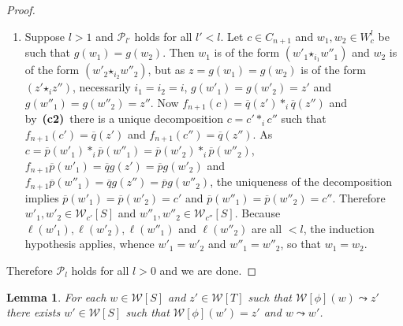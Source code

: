 \documentclass[reqno]{amsart}
\theoremstyle{plain}
\newtheorem{lemma}[subsubsection]{Lemma}
\theoremstyle{definition}
\theoremstyle{remark}
\newcommand{\unit}[1]{1^{#1}} %
\newcommand{\comp}[1]{\ast_{#1}} %
\newcommand{\WW}{\mathcal{W}}
\newcommand{\wtx}[1]{\WW[#1]} %
\newcommand{\wtxr}[2]{\WW_{#1}[#2]} %
\newcommand{\formal}[1]{\mathsf{#1}} %
\newcommand{\fid}[1]{\formal{i}_{#1}} %
\newcommand{\fcomp}[1]{\bm{\star}_{#1}} %
\newcommand{\frel}{\leadsto} %
\newcommand{\lgh}{\ell}%
\newcommand{\extend}[1]{\overline{#1}} %
\newcommand{\cndii}{\textbf{(c2)}} %
\begin{document}
\begin{proof}
\begin{enumerate}
\begin{enumerate}
      $\fid{x'}$ for some $x'\in C_n$ such that $f_n(x')=f_n(x)$. Now
      $\unit{n+1}(x)=\extend p(w_1)=c=\extend p(w_2)=\unit{n+1}(x')$
      so that $x=x'$ and $w_1=w_2$.
    \end{enumerate}
    \item Suppose $l>1$ and $\mathcal{P}_{l'}$ holds for all
      $l'<l$. Let $c\in C_{n+1}$ and $w_1,w_2\in W^l_c$ be such that
      $g(w_1)=g(w_2)$. Then $w_1$ is of the form $(w'_1\fcomp{i_1}
      w''_1)$ and  $w_2$ is of the form $(w'_2\fcomp{i_2} w''_2)$, but
      as $z=g(w_1)=g(w_2)$ is of the form $(z'\fcomp i z'')$,
      necessarily $i_1=i_2=i$,
      $g(w'_1)=g(w'_2)=z'$ and $g(w''_1)=g(w''_2)=z''$. Now
      $f_{n+1}(c)=\extend{q}(z')\comp i \extend{q}(z'')$ and by~\cndii\ there is a unique decomposition
      $c=c'\comp i c''$ such that $f_{n+1}(c')=\extend{q}(z')$ and
      $f_{n+1}(c'')=\extend{q}(z'')$. As $c=\extend{p}(w'_1)\comp
      i\extend{p}(w''_1)=\extend{p}(w'_2)\comp i\extend{p}(w''_2)$,
      $f_{n+1}\extend p(w'_1)=\extend qg(z')=\extend pg(w'_2)$ and
      $f_{n+1}\extend p(w''_1)=\extend qg(z'')=\extend pg(w''_2)$, the
      uniqueness of the decomposition implies $\extend p
      (w'_1)=\extend p(w'_2)=c'$ and  $\extend p(w''_1)=\extend p(w''_2)=c''$.
Therefore $w'_1,w'_2\in \wtxr {c'}S$ and $w''_1,w''_2\in \wtxr
{c''}S$. Because $\lgh(w'_1),\lgh(w'_2),\lgh(w''_1)$ and $\lgh(w''_2)$
are all $<l$, the induction hypothesis applies, whence 
      $w'_1=w'_2$ and $w''_1=w''_2$, so that $w_1=w_2$.
    \end{enumerate}
 Therefore  $\mathcal{P}_l$ holds for all $l>0$ and we are done.  
 \end{proof}
\begin{lemma}\label{lemma:forward_lift_frel}
 For each $w\in \wtx S$ and $z'\in\wtx
 T$ such that $\wtx{\phi}(w)\frel z'$ there exists $w'\in\wtx S$ such
 that $\wtx\phi(w')=z'$ and $w\frel w'$.
\end{lemma}
\end{document}
